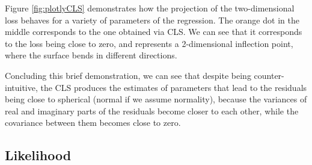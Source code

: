 \documentclass[
]{book}
\begin{document}
Figure \ref{fig:plotlyCLS} demonstrates how the projection of the two-dimensional loss behaves for a variety of parameters of the regression. The orange dot in the middle corresponds to the one obtained via CLS. We can see that it corresponds to the loss being close to zero, and represents a 2-dimensional inflection point, where the surface bends in different directions.

Concluding this brief demonstration, we can see that despite being counter-intuitive, the CLS produces the estimates of parameters that lead to the residuals being close to spherical (normal if we assume normality), because the variances of real and imaginary parts of the residuals become closer to each other, while the covariance between them becomes close to zero.

\hypertarget{SCLREstimationLikelihood}{%
\subsection{Likelihood}\label{SCLREstimationLikelihood}}
\end{document}

